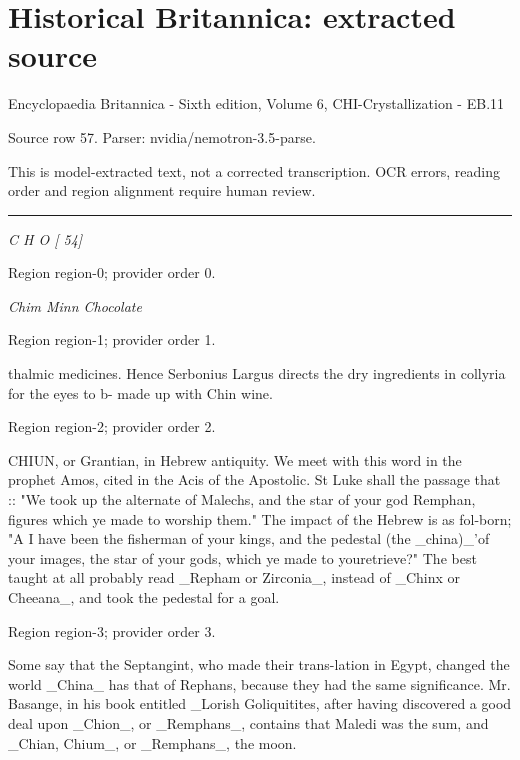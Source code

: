 \documentclass[11pt]{article}
\begin{document}
\section*{Historical Britannica: extracted source}
Encyclopaedia Britannica - Sixth edition, Volume 6, CHI-Crystallization - EB.11\par
{\small Source row 57. Parser: nvidia/nemotron-3.5-parse.\par}
{\small This is model-extracted text, not a corrected transcription. OCR errors, reading order and region alignment require human review.\par}
\hrule\medskip
{\small\itshape C H O [ 54]\par}

{\scriptsize\color{gray} Region region-0; provider order 0.\par}
\medskip

{\small\itshape Chim Minn Chocolate\par}

{\scriptsize\color{gray} Region region-1; provider order 1.\par}
\medskip

thalmic medicines. Hence Serbonius Largus directs the dry ingredients in collyria for the eyes to b- made up with Chin wine.
\par

{\scriptsize\color{gray} Region region-2; provider order 2.\par}
\medskip

CHIUN, or Grantian, in Hebrew antiquity. We meet with this word in the prophet Amos, cited in the Acis of the Apostolic. St Luke shall the passage that :: "We took up the alternate of Malechs, and the star of your god Remphan, figures which ye made to worship them." The impact of the Hebrew is as fol-born; "A I have been the fisherman of your kings, and the pedestal (the \_china)\_’of your images, the star of your gods, which ye made to youretrieve?" The best taught at all probably read \_Repham or Zirconia\_, instead of \_Chinx or Cheeana\_, and took the pedestal for a goal.
\par

{\scriptsize\color{gray} Region region-3; provider order 3.\par}
\medskip

Some say that the Septangint, who made their trans-lation in Egypt, changed the world \_China\_ has that of Rephans, because they had the same significance. Mr. Basange, in his book entitled \_Lorish Goliquitites, after having discovered a good deal upon \_Chion\_, or \_Remphans\_, contains that Maledi was the sum, and \_Chian, Chium\_, or \_Remphans\_, the moon.
\par
\end{document}
